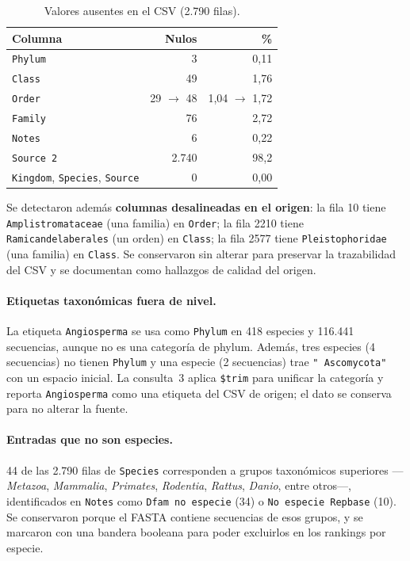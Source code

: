 \documentclass[journal]{IEEEtran}
\begin{document}
\begin{table}[!t]
\caption{Valores ausentes en el CSV (2.790 filas).}
\label{tab:ausentes}
\centering
\footnotesize
\begin{tabular}{@{}lrr@{}}
\toprule
Columna & Nulos & \% \\
\midrule
\texttt{Phylum} & 3 & 0,11 \\
\texttt{Class} & 49 & 1,76 \\
\texttt{Order} & 29 $\rightarrow$ 48 & 1,04 $\rightarrow$ 1,72 \\
\texttt{Family} & 76 & 2,72 \\
\texttt{Notes} & 6 & 0,22 \\
\texttt{Source 2} & 2.740 & 98,2 \\
\texttt{Kingdom}, \texttt{Species}, \texttt{Source} & 0 & 0,00 \\
\bottomrule
\end{tabular}
\end{table}

Se detectaron además \textbf{columnas desalineadas en el origen}: la fila 10 tiene
\texttt{Amplistromataceae} (una familia) en \texttt{Order}; la fila 2210 tiene
\texttt{Ramicandelaberales} (un orden) en \texttt{Class}; la fila 2577 tiene
\texttt{Pleistophoridae} (una familia) en \texttt{Class}. Se conservaron sin alterar para
preservar la trazabilidad del CSV y se documentan como hallazgos de calidad del origen.

\paragraph*{Etiquetas taxonómicas fuera de nivel.}
La etiqueta \texttt{Angiosperma} se usa como \texttt{Phylum} en 418 especies y 116.441
secuencias, aunque no es una categoría de phylum. Además, tres especies (4 secuencias) no
tienen \texttt{Phylum} y una especie (2 secuencias) trae \texttt{"{} Ascomycota"} con un
espacio inicial. La consulta~3 aplica \texttt{\$trim} para unificar la categoría y reporta
\texttt{Angiosperma} como una etiqueta del CSV de origen; el dato se conserva para no
alterar la fuente.

\paragraph*{Entradas que no son especies.}
44 de las 2.790 filas de \texttt{Species} corresponden a grupos taxonómicos superiores
---\textit{Metazoa}, \textit{Mammalia}, \textit{Primates}, \textit{Rodentia},
\textit{Rattus}, \textit{Danio}, entre otros---, identificados en \texttt{Notes} como
\texttt{Dfam no especie} (34) o \texttt{No especie Repbase} (10). Se conservaron porque el
FASTA contiene secuencias de esos grupos, y se marcaron con una bandera booleana para
poder excluirlos en los rankings por especie.
\end{document}

